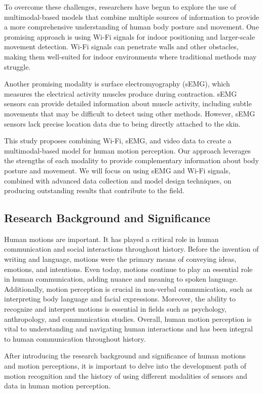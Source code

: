 \documentclass[12pt, a4paper]{article}
\begin{document}
To overcome these challenges, researchers have begun to explore the use of multimodal-based models that combine multiple sources of information to provide a more comprehensive understanding of human body posture and movement. One promising approach is using Wi-Fi signals for indoor positioning and larger-scale movement detection. Wi-Fi signals can penetrate walls and other obstacles, making them well-suited for indoor environments where traditional methods may struggle.

Another promising modality is surface electromyography (sEMG), which measures the electrical activity muscles produce during contraction. sEMG sensors can provide detailed information about muscle activity, including subtle movements that may be difficult to detect using other methods. However, sEMG sensors lack precise location data due to being directly attached to the skin.

This study proposes combining Wi-Fi, sEMG, and video data to create a multimodal-based model for human motion perception. Our approach leverages the strengths of each modality to provide complementary information about body posture and movement. We will focus on using sEMG and Wi-Fi signals, combined with advanced data collection and model design techniques, on producing outstanding results that contribute to the field.
\subsection{Research Background and Significance}
Human motions are important. It has played a critical role in human communication and social interactions throughout history. Before the invention of writing and language, motions were the primary means of conveying ideas, emotions, and intentions. Even today, motions continue to play an essential role in human communication, adding nuance and meaning to spoken language. Additionally, motion perception is crucial in non-verbal communication, such as interpreting body language and facial expressions. Moreover, the ability to recognize and interpret motions is essential in fields such as psychology, anthropology, and communication studies. Overall, human motion perception is vital to understanding and navigating human interactions and has been integral to human communication throughout history.

After introducing the research background and significance of human motions and motion perceptions, it is important to delve into the development path of motion recognition and the history of using different modalities of sensors and data in human motion perception.
\end{document}
